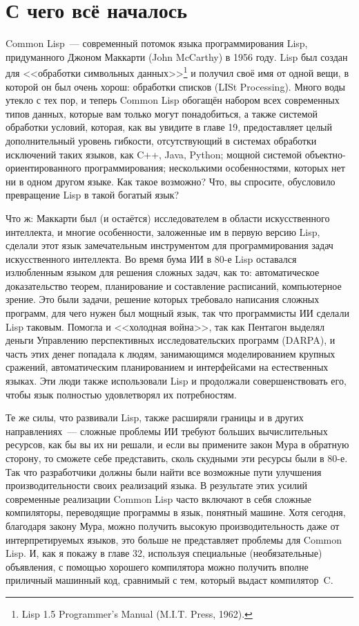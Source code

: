 \section{С чего всё началось}

Common Lisp~--- современный потомок языка программирования Lisp, придуманного Джоном
Маккарти (John McCarthy) в 1956 году. Lisp был создан для <<обработки символьных
данных>>\footnote{Lisp 1.5 Programmer's Manual (M.I.T. Press, 1962).} и получил своё имя от
одной вещи, в которой он был очень хорош: обработки списков (LISt Processing). Много воды
утекло с тех пор, и теперь Common Lisp обогащён набором всех современных типов данных, которые
вам только могут понадобиться, а также системой обработки условий, которая, как вы
увидите в главе 19, предоставляет целый дополнительный уровень гибкости, отсутствующий в системах обработки
исключений таких языков, как C++, Java, Python; мощной системой объектно-ориентированного
программирования; несколькими особенностями, которых нет ни в одном другом языке. Как
такое возможно? Что, вы спросите, обусловило превращение Lisp в такой богатый язык?

Что ж: Маккарти был (и остаётся)
исследователем в области искусственного интеллекта, и многие
особенности, заложенные им в первую версию Lisp, сделали этот язык замечательным
инструментом для программирования задач искусственного интеллекта. Во время бума ИИ в 80-е Lisp
оставался излюбленным языком для решения сложных задач, как то: автоматическое
доказательство теорем, планирование и составление расписаний, компьютерное зрение. Это
были задачи, решение которых требовало написания сложных программ, для чего нужен был мощный язык,
так что программисты ИИ сделали Lisp таковым. Помогла и <<холодная война>>, так как Пентагон
выделял деньги Управлению перспективных исследовательских программ (DARPA), и часть этих
денег попадала к людям, занимающимся моделированием крупных сражений, автоматическим
планированием и интерфейсами на естественных языках. Эти люди также использовали Lisp и
продолжали совершенствовать его, чтобы язык полностью удовлетворял их потребностям.

Те же силы, что развивали Lisp, также расширяли границы и в других направлениях~---
сложные проблемы ИИ требуют больших вычислительных ресурсов, как бы вы их ни решали, и
если вы примените закон Мура в обратную сторону, то сможете себе представить, сколь
скудными эти ресурсы были в 80-е. Так что разработчики должны были найти все возможные
пути улучшения производительности своих реализаций языка. В результате этих усилий
современные реализации Common Lisp часто включают в себя сложные компиляторы, переводящие
программы в язык,
понятный машине. Хотя сегодня, благодаря закону Мура, можно получить высокую
производительность даже от интерпретируемых языков, это больше не представляет проблемы для
Common Lisp. И, как я покажу в главе 32, используя специальные (необязательные)
объявления, с помощью хорошего компилятора можно получить вполне приличный машинный код,
сравнимый с тем, который выдаст компилятор~C.

